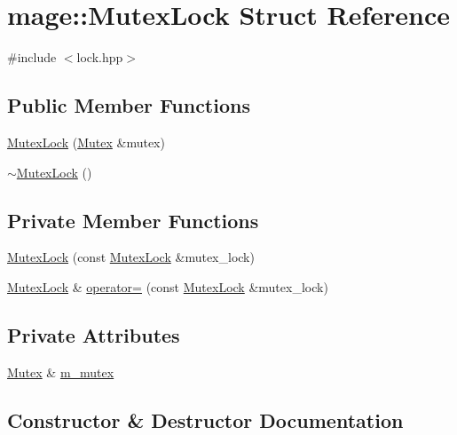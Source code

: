 \hypertarget{structmage_1_1_mutex_lock}{}\section{mage\+:\+:Mutex\+Lock Struct Reference}
\label{structmage_1_1_mutex_lock}


{\ttfamily \#include $<$lock.\+hpp$>$}

\subsection*{Public Member Functions}
\begin{DoxyCompactItemize}
\item 
\hyperlink{structmage_1_1_mutex_lock_aa8cd93677eec2656ca217fdf79f911c4}{Mutex\+Lock} (\hyperlink{classmage_1_1_mutex}{Mutex} \&mutex)
\item 
\hyperlink{structmage_1_1_mutex_lock_a2631e8878646b2d25b136b6adb55d553}{$\sim$\+Mutex\+Lock} ()
\end{DoxyCompactItemize}
\subsection*{Private Member Functions}
\begin{DoxyCompactItemize}
\item 
\hyperlink{structmage_1_1_mutex_lock_a9bfeb564ac4563e10d8fe569870d0e18}{Mutex\+Lock} (const \hyperlink{structmage_1_1_mutex_lock}{Mutex\+Lock} \&mutex\+\_\+lock)
\item 
\hyperlink{structmage_1_1_mutex_lock}{Mutex\+Lock} \& \hyperlink{structmage_1_1_mutex_lock_ac625ca4d598180b01f58e81062462ca8}{operator=} (const \hyperlink{structmage_1_1_mutex_lock}{Mutex\+Lock} \&mutex\+\_\+lock)
\end{DoxyCompactItemize}
\subsection*{Private Attributes}
\begin{DoxyCompactItemize}
\item 
\hyperlink{classmage_1_1_mutex}{Mutex} \& \hyperlink{structmage_1_1_mutex_lock_a1c796e1e66bd49007fe746d1425b82f4}{m\+\_\+mutex}
\end{DoxyCompactItemize}


\subsection{Constructor \& Destructor Documentation}
\hypertarget{structmage_1_1_mutex_lock_aa8cd93677eec2656ca217fdf79f911c4}{}\label{structmage_1_1_mutex_lock_aa8cd93677eec2656ca217fdf79f911c4} 
